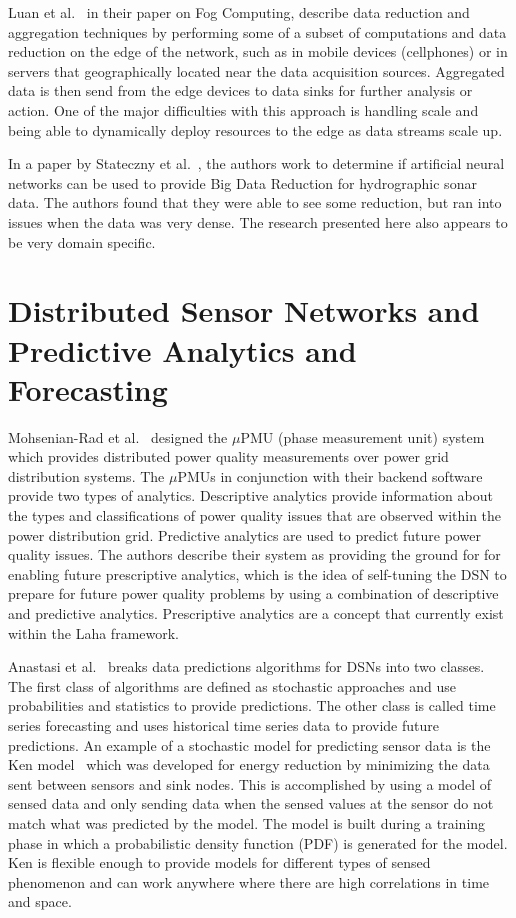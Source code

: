 Luan et al.~\cite{luan2015fog} in their paper on Fog Computing, describe data reduction and aggregation techniques by performing some of a subset of computations and data reduction on the edge of the network, such as in mobile devices (cellphones) or in servers that geographically located near the data acquisition sources. Aggregated data is then send from the edge devices to data sinks for further analysis or action. One of the major difficulties with this approach is handling scale and being able to dynamically deploy resources to the edge as data streams scale up.

In a paper by Stateczny et al.~\cite{stateczny2014self}, the authors work to determine if artificial neural networks can be used to provide Big Data Reduction for hydrographic sonar data. The authors found that they were able to see some reduction, but ran into issues when the data was very dense. The research presented here also appears to be very domain specific.

\section{Distributed Sensor Networks and Predictive Analytics and Forecasting}\label{sec:distributed-sensor-networks-and-predictive-analytics-and-forecasting}

Mohsenian-Rad et al.~\cite{mohsenian2018distribution} designed the $\mu$PMU (phase measurement unit) system which provides distributed power quality measurements over power grid distribution systems. The $\mu$PMUs in conjunction with their backend software provide two types of analytics. Descriptive analytics provide information about the types and classifications of power quality issues that are observed within the power distribution grid. Predictive analytics are used to predict future power quality issues. The authors describe their system as providing the ground for for enabling future prescriptive analytics, which is the idea of self-tuning the DSN to prepare for future power quality problems by using a combination of descriptive and predictive analytics. Prescriptive analytics are a concept that currently exist within the Laha framework.

Anastasi et al.~\cite{anastasi_energy_2009} breaks data predictions algorithms for DSNs into two classes. The first class of algorithms are defined as stochastic approaches and use probabilities and statistics to provide predictions. The other class is called time series forecasting and uses historical time series data to provide future predictions. An example of a stochastic model for predicting sensor data is the Ken model~\cite{chu2006approximate} which was developed for energy reduction by minimizing the data sent between sensors and sink nodes. This is accomplished by using a model of sensed data and only sending data when the sensed values at the sensor do not match what was predicted by the model. The model is built during a training phase in which a probabilistic density function (PDF) is generated for the model. Ken is flexible enough to provide models for different types of sensed phenomenon and can work anywhere where there are high correlations in time and space.

